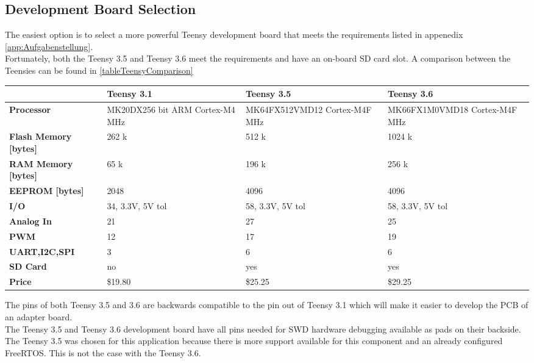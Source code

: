 \subsection{Development Board Selection} \label{subsec:txtTeensySelection}
The easiest option is to select a more powerful Teensy development board that meets the requirements listed in appenedix \autoref{app:Aufgabenstellung}.\\
Fortunately, both the Teensy 3.5 and Teensy 3.6 meet the requirements and have an on-board SD card slot. A comparison between the Teensies can be found in \autoref{tableTeensyComparison}
%
\begin{table}[h]
    \begin{center}
        \begin{tabular}{l|L{4cm}L{4cm}L{4cm}}
             & \textbf{Teensy 3.1} & \textbf{Teensy 3.5} & \textbf{Teensy 3.6} \\
             \hline
            \textbf{Processor} & MK20DX256  bit ARM \newline Cortex-M4  MHz & 
            MK64FX512VMD12 \newline Cortex-M4F  MHz & 
            MK66FX1M0VMD18 \newline Cortex-M4F  MHz \\
            \textbf{Flash Memory [bytes]} & 262 k & 512 k & 1024 k \\
            \textbf{RAM Memory [bytes]} & 65 k & 196 k & 256 k \\
            \textbf{EEPROM [bytes]}	 & 2048 & 4096 & 4096 \\
            \textbf{I/O} & 34, 3.3V, 5V tol & 58, 3.3V, 5V tol & 58, 3.3V, 5V tol \\
            \textbf{Analog In} & 21 & 27 & 25 \\
            \textbf{PWM} & 12 & 17 & 19 \\
            \textbf{UART,I2C,SPI} & 3 & 6 & 6 \\
            \textbf{SD Card} & no & yes & yes \\
            \textbf{Price} & \$19.80 & \$25.25 & \$29.25 \\
        \end{tabular}
    \end{center}
    \label{tableTeensyComparison}
\end{table}
%
The pins of both Teensy 3.5 and 3.6 are backwards compatible to the pin out of Teensy 3.1 which will make it easier to develop the PCB of an adapter board. \\
The Teensy 3.5 and Teensy 3.6 development board have all pins needed for SWD hardware debugging available as pads on their backside. \\
The Teensy 3.5 was chosen for this application because there is more support available for this component and an already configured FreeRTOS. This is not the case with the Teensy 3.6.\\
%
%
